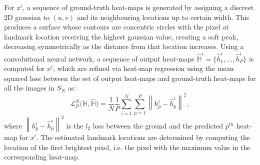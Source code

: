 \documentclass[conference]{IEEEtran}
\newcommand\norm[1]{\left\lVert#1\right\rVert}
\begin{document}
For $x^i$, a sequence of ground-truth heat-maps is generated by assigning a discreet 2D gaussian  to $(u, v)$ and its neighbouring locations up to certain width. This produces a surface whose contours are concentric circles with the pixel at landmark location receiving the highest gaussian value, creating a soft peak, decreasing symmetrically as the distance from that location increases. Using a convolutional neural network, a sequence of output heat-maps $\hat{\mathbb{H}}^i= \{\hat{h}^i_1,\dots ,\hat{h}^i_P \}$ is computed for $x^i$, which are refined via heat-map regression using the mean squared loss  between the set of output heat-maps and ground-truth heat-maps for all the images in $S_N$ as: 
% 
\begin{equation}
\mathcal{L}^{N}_P \big( \mathbb{H} , \hat{\mathbb{H}}\big) = \frac{1}{N}\frac{1}{P} \sum_{i = 1}^{N} \sum_{p = 1}^{P} \norm{ h^i_{p} - \hat{h}^i_p }^2,
\end{equation}
% 
where $\norm{h^i_{p} - \hat{h}^i_{p}}^2$ is the $l_2$ loss between the ground and the predicted $p^{th}$ heat-map for $x^i$. The estimated landmark locations are determined by computing the location of the first brightest pixel, i.e. the pixel with the maximum value in the corresponding heat-map. 
\end{document}
